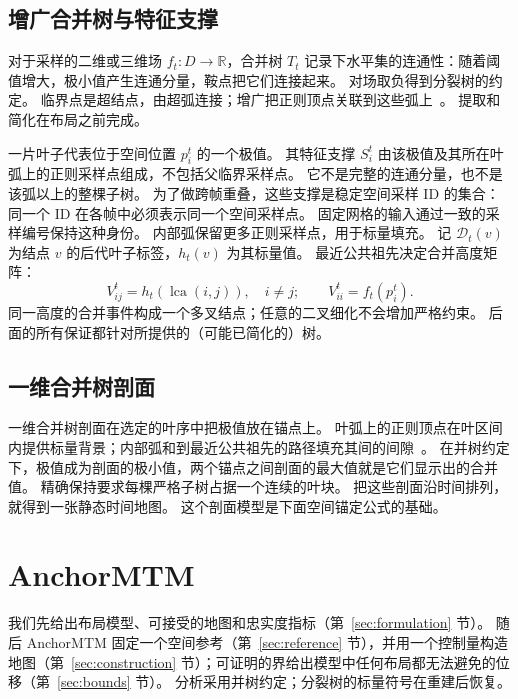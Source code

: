 \documentclass[fontset=none,zihao=5,a4paper]{ctexart}
\newcommand{\lca}{\operatorname{lca}}
\begin{document}
\subsection{增广合并树与特征支撑}
对于采样的二维或三维场 $f_t:D\to\mathbb{R}$，合并树 $T_t$ 记录下水平集的连通性：随着阈值增大，极小值产生连通分量，鞍点把它们连接起来。
对场取负得到分裂树的约定。
临界点是超结点，由超弧连接；增广把正则顶点关联到这些弧上~\cite{Koepp:2023:TMTM,STMTM:2026,Tierny:2018:TTK}。
提取和简化在布局之前完成。

一片叶子代表位于空间位置 $p_i^t$ 的一个极值。
其特征支撑 $S_i^t$ 由该极值及其所在叶弧上的正则采样点组成，不包括父临界采样点。
它不是完整的连通分量，也不是该弧以上的整棵子树。
为了做跨帧重叠，这些支撑是稳定空间采样 ID 的集合：同一个 ID 在各帧中必须表示同一个空间采样点。
固定网格的输入通过一致的采样编号保持这种身份。
内部弧保留更多正则采样点，用于标量填充。
记 $\mathcal{D}_t(v)$ 为结点 $v$ 的后代叶子标签，$h_t(v)$ 为其标量值。
最近公共祖先决定合并高度矩阵：
\begin{equation}\label{eq:merge}
 V_{ij}^t=h_t(\lca(i,j)),\quad i\ne j;\qquad
 V_{ii}^t=f_t(p_i^t).
\end{equation}
同一高度的合并事件构成一个多叉结点；任意的二叉细化不会增加严格约束。
后面的所有保证都针对所提供的（可能已简化的）树。

\subsection{一维合并树剖面}
一维合并树剖面在选定的叶序中把极值放在锚点上。
叶弧上的正则顶点在叶区间内提供标量背景；内部弧和到最近公共祖先的路径填充其间的间隙~\cite{Koepp:2023:TMTM,STMTM:2026}。
在并树约定下，极值成为剖面的极小值，两个锚点之间剖面的最大值就是它们显示出的合并值。
精确保持要求每棵严格子树占据一个连续的叶块。
把这些剖面沿时间排列，就得到一张静态时间地图。
这个剖面模型是下面空间锚定公式的基础。

\section{AnchorMTM}\label{sec:method}
我们先给出布局模型、可接受的地图和忠实度指标（第~\ref{sec:formulation} 节）。
随后 AnchorMTM 固定一个空间参考（第~\ref{sec:reference} 节），并用一个控制量构造地图（第~\ref{sec:construction} 节）；可证明的界给出模型中任何布局都无法避免的位移（第~\ref{sec:bounds} 节）。
分析采用并树约定；分裂树的标量符号在重建后恢复。
\end{document}
